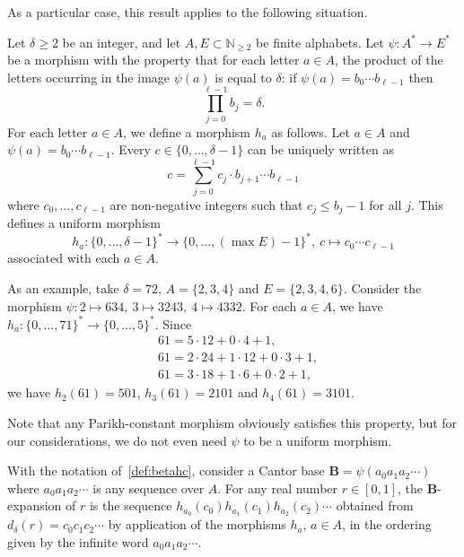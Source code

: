 \documentclass[12pt,reqno]{amsart}
\newcommand{\B}{{\mathbf{B}}}
\begin{document}
As a particular case, this result applies to the following situation. 

\begin{definition}
\label{def:betahc}
Let $\delta\geq 2$ be an integer, and let $A,E\subset \mathbb{N}_{\ge 2}$ be finite alphabets. Let $\psi\colon A^* \to E^*$ be a morphism with the property that for each letter $a\in A$, the product of the letters occurring in the image $\psi(a)$ is equal to $\delta$: if $\psi(a)=b_0\cdots b_{\ell-1}$ then 
\[
    \prod_{j=0}^{\ell-1}b_j=\delta.
\]
For each letter $a\in A$, we define a morphism $h_a$ as follows. Let $a\in A$ and $\psi(a)=b_0\cdots b_{\ell-1}$. Every $c\in\{0,\ldots,\delta-1\}$ can be uniquely written as
  \[
    c=\sum_{j=0}^{\ell-1}c_j\cdot b_{j+1}\cdots b_{\ell-1}
  \]
  where $c_0,\ldots,c_{\ell-1}$ are non-negative integers such that $c_j\le b_j-1$ for all $j$. This defines a uniform morphism 
  \begin{equation*}
    \label{eq:hc}
    h_a\colon\{0,\ldots,\delta-1\}^*\to \{0,\ldots,(\max E)-1\}^*,\ c\mapsto c_0\cdots c_{\ell-1}
   \end{equation*}
   associated with each $a\in A$.
\end{definition}

As an example, take $\delta=72$, $A=\{2,3,4\}$ and $E=\{2,3,4,6\}$. Consider the morphism $\psi\colon 2\mapsto 634,\ 3\mapsto 3243,\ 4\mapsto 4332$. For each $a\in A$, we have $h_a\colon \{0,\ldots,71\}^*\to \{0,\ldots,5\}^*$. Since 
\begin{align*}
    &61=5 \cdot 12+ 0\cdot 4 +1, \\
    &61=2\cdot 24 +1\cdot 12 +0\cdot 3 +1, \\
    &61=3\cdot 18 +1\cdot 6 +0\cdot 2+1,
\end{align*}
we have $h_2(61)=501$, $h_3(61)=2101$ and $h_4(61)=3101$. 

Note that any Parikh-constant morphism obviously satisfies this property, but for our considerations, we do not even need $\psi$ to be a uniform morphism. 

\begin{corollary}
    \label{cor:betahc}
With the notation of~\cref{def:betahc}, consider a Cantor base $\B=\psi(a_0a_1a_2\cdots)$ where $a_0a_1a_2\cdots$ is any sequence over $A$. For any real number $r\in [0,1]$, the $\B$-expansion of $r$ is the sequence 
$h_{a_0}(c_0)h_{a_1}(c_1)h_{a_2}(c_2)\cdots$ obtained from $d_\delta(r)=c_0c_1c_2\cdots$ by application of the morphisms $h_a$, $a\in A$, in the ordering given by the infinite word $a_0a_1a_2\cdots$.
\end{corollary}
\end{document}
